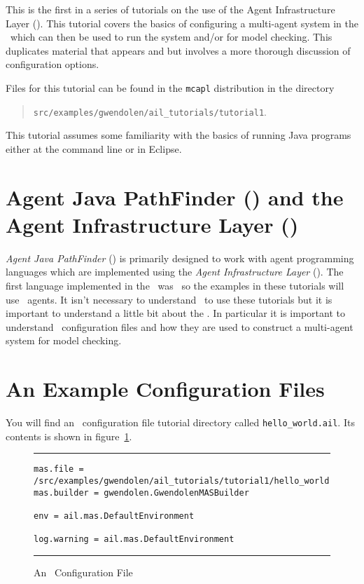 
This is the first in a series of tutorials on the use of the Agent Infrastructure Layer (\ail).  This tutorial covers the basics of configuring a multi-agent system in the \ail\ which can then be used to run the system and/or for model checking.  This duplicates material that appears  and  but involves a more thorough discussion of configuration options.

Files for this tutorial can be found in the \texttt{mcapl} distribution in the directory 
\begin{quote}
\texttt{src/examples/gwendolen/ail\_tutorials/tutorial1}.
\end{quote}

This tutorial assumes some familiarity with the basics of running Java programs either at the command line or in Eclipse.

\section{Agent Java PathFinder (\ajpf) and the Agent Infrastructure Layer (\ail)}

\emph{Agent Java PathFinder} (\ajpf) is primarily designed to work with agent programming languages which are implemented using the \emph{Agent Infrastructure Layer} (\ail).  The first language implemented in the \ail\ was \gwendolen\ so  the examples in these tutorials will use \gwendolen\ agents.  It isn't necessary to understand \gwendolen\ to use these tutorials but it is important to understand a little bit about the \ail.  In particular it is important to understand \ail\ configuration files and how they are used to construct a multi-agent system for model checking.

\section{An Example Configuration Files}

You will find an \ail\ configuration file tutorial directory called \texttt{hello\_world.ail}.  Its contents is shown in figure~\ref{fig:ail_config}.

\begin{figure}[htb]
\noindent\rule{\textwidth}{1pt}
\begin{verbatim}
mas.file = /src/examples/gwendolen/ail_tutorials/tutorial1/hello_world.gwen
mas.builder = gwendolen.GwendolenMASBuilder

env = ail.mas.DefaultEnvironment

log.warning = ail.mas.DefaultEnvironment
\end{verbatim}
\rule{\textwidth}{1pt}
\caption{An \ail\ Configuration File}
\label{fig:ail_config}
\end{figure}

